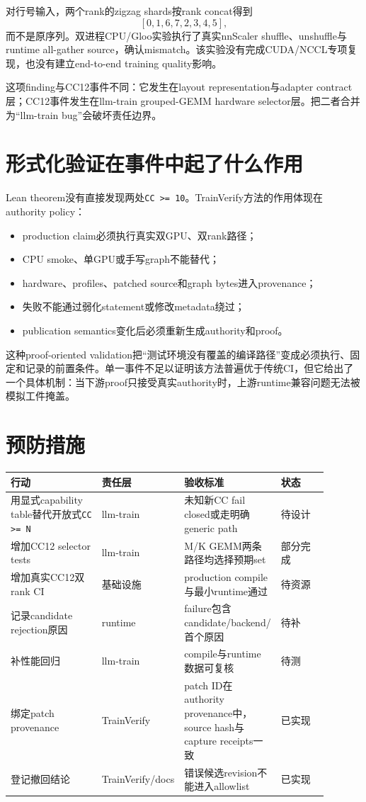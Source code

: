 \documentclass[10.5pt,a4paper]{ctexart}
\begin{document}
对行号输入，两个rank的zigzag shards按rank concat得到
\[
[0,1,6,7,2,3,4,5],
\]
而不是原序列。双进程CPU/Gloo实验执行了真实nnScaler shuffle、unshuffle与runtime all-gather source，确认mismatch。该实验没有完成CUDA/NCCL专项复现，也没有建立end-to-end training quality影响。

这项finding与CC12事件不同：它发生在layout representation与adapter contract层；CC12事件发生在llm-train grouped-GEMM hardware selector层。把二者合并为“llm-train bug”会破坏责任边界。

\section{形式化验证在事件中起了什么作用}

Lean theorem没有直接发现两处\texttt{CC >= 10}。TrainVerify方法的作用体现在authority policy：
\begin{itemize}
  \item production claim必须执行真实双GPU、双rank路径；
  \item CPU smoke、单GPU或手写graph不能替代；
  \item hardware、profiles、patched source和graph bytes进入provenance；
  \item 失败不能通过弱化statement或修改metadata绕过；
  \item publication semantics变化后必须重新生成authority和proof。
\end{itemize}

这种proof-oriented validation把“测试环境没有覆盖的编译路径”变成必须执行、固定和记录的前置条件。单一事件不足以证明该方法普遍优于传统CI，但它给出了一个具体机制：当下游proof只接受真实authority时，上游runtime兼容问题无法被模拟工件掩盖。

\section{预防措施}

\begin{longtable}{L{0.30\linewidth}L{0.19\linewidth}L{0.24\linewidth}L{0.16\linewidth}}
\toprule
行动 & 责任层 & 验收标准 & 状态 \\
\midrule
用显式capability table替代开放式\texttt{CC >= N} & llm-train & 未知新CC fail closed或走明确generic path & 待设计 \\
增加CC12 selector tests & llm-train & M/K GEMM两条路径均选择预期set & 部分完成 \\
增加真实CC12双rank CI & 基础设施 & production compile与最小runtime通过 & 待资源 \\
记录candidate rejection原因 & runtime & failure包含candidate/backend/首个原因 & 待补 \\
补性能回归 & llm-train & compile与runtime数据可复核 & 待测 \\
绑定patch provenance & TrainVerify & patch ID在authority provenance中，source hash与capture receipts一致 & 已实现 \\
登记撤回结论 & TrainVerify/docs & 错误候选revision不能进入allowlist & 已实现 \\
\bottomrule
\end{longtable}
\end{document}
